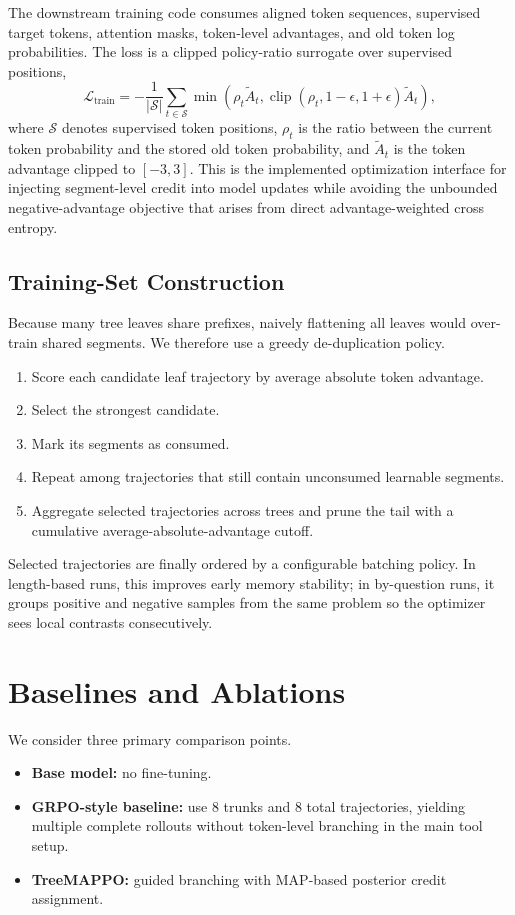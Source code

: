 \documentclass{article}
\newcommand{\ours}{TreeMAPPO}
\begin{document}
The downstream training code consumes aligned token sequences, supervised target tokens, attention masks, token-level advantages, and old token log probabilities. The loss is a clipped policy-ratio surrogate over supervised positions,
\begin{equation}
\mathcal{L}_{\text{train}} = -\frac{1}{|\mathcal{S}|}
\sum_{t \in \mathcal{S}}
\min\left(
\rho_t \tilde{A}_t,
\operatorname{clip}(\rho_t,1-\epsilon,1+\epsilon)\tilde{A}_t
\right),
\end{equation}
where $\mathcal{S}$ denotes supervised token positions, $\rho_t$ is the ratio between the current token probability and the stored old token probability, and $\tilde{A}_t$ is the token advantage clipped to $[-3,3]$. This is the implemented optimization interface for injecting segment-level credit into model updates while avoiding the unbounded negative-advantage objective that arises from direct advantage-weighted cross entropy.

\subsection{Training-Set Construction}
Because many tree leaves share prefixes, naively flattening all leaves would over-train shared segments. We therefore use a greedy de-duplication policy.
\begin{enumerate}
    \item Score each candidate leaf trajectory by average absolute token advantage.
    \item Select the strongest candidate.
    \item Mark its segments as consumed.
    \item Repeat among trajectories that still contain unconsumed learnable segments.
    \item Aggregate selected trajectories across trees and prune the tail with a cumulative average-absolute-advantage cutoff.
\end{enumerate}

Selected trajectories are finally ordered by a configurable batching policy. In length-based runs, this improves early memory stability; in by-question runs, it groups positive and negative samples from the same problem so the optimizer sees local contrasts consecutively.

\section{Baselines and Ablations}
We consider three primary comparison points.
\begin{itemize}
    \item \textbf{Base model:} no fine-tuning.
    \item \textbf{GRPO-style baseline:} use 8 trunks and 8 total trajectories, yielding multiple complete rollouts without token-level branching in the main tool setup.
    \item \textbf{\ours:} guided branching with MAP-based posterior credit assignment.
\end{itemize}
\end{document}
